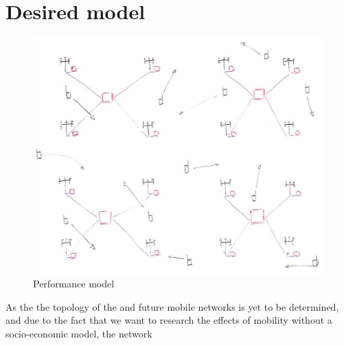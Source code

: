 \section{Desired model}



\begin{figure}[tb]
	\centering
	\includegraphics[width=\linewidth]{performance_delay.jpg} 
	\caption{Performance model}
	\label{fig:performance_model}
\end{figure}

As the the topology of the \xcloud and future mobile networks is yet to be determined, and due to the fact that we want to research the effects of mobility without a socio-economic model, the network 